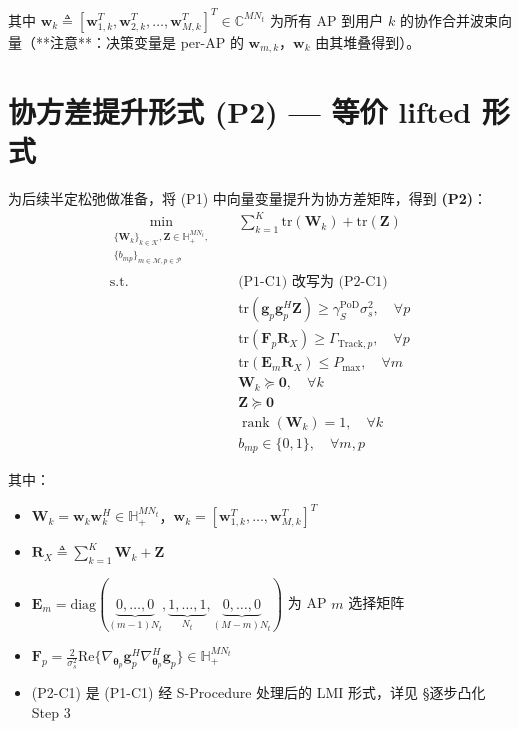 \documentclass[12pt,a4paper]{article}
\newcommand{\vect}[1]{\mathbf{#1}}
\newcommand{\mat}[1]{\mathbf{#1}}
\newcommand{\tr}{\text{tr}}
\newcommand{\Real}{\text{Re}}
\DeclareMathOperator{\rank}{rank}
\begin{document}
其中 $\vect{w}_k \triangleq [\vect{w}_{1,k}^T, \vect{w}_{2,k}^T, \ldots, \vect{w}_{M,k}^T]^T \in \mathbb{C}^{MN_t}$ 为所有 AP 到用户 $k$ 的协作合并波束向量（**注意**：决策变量是 per-AP 的 $\vect{w}_{m,k}$，$\vect{w}_k$ 由其堆叠得到）。

\section{协方差提升形式 (P2) — 等价 lifted 形式}

为后续半定松弛做准备，将 (P1) 中向量变量提升为协方差矩阵，得到 \textbf{(P2)}：
\begin{align}
\min_{\substack{\{\mat{W}_k\}_{k\in\mathcal{K}}, \mat{Z} \in \mathbb{H}_+^{MN_t}, \\ \{b_{mp}\}_{m\in\mathcal{M},p\in\mathcal{P}}}} \quad
& \sum_{k=1}^K \tr(\mat{W}_k) + \tr(\mat{Z}) \tag{P2} \\
\text{s.t.} \quad
& \text{(P1-C1) 改写为 (P2-C1)} \tag{P2-C1} \\
& \tr(\vect{g}_p \vect{g}_p^H \mat{Z}) \geq \gamma_S^{\text{PoD}} \sigma_s^2, \quad \forall p \tag{P2-C2} \\
& \tr(\mat{F}_p \mat{R}_X) \geq \Gamma_{\text{Track},p}, \quad \forall p \tag{P2-C3} \\
& \tr(\mat{E}_m \mat{R}_X) \leq P_{\max}, \quad \forall m \tag{P2-C4} \\
& \mat{W}_k \succeq \mat{0}, \quad \forall k \tag{P2-C5} \\
& \mat{Z} \succeq \mat{0} \tag{P2-C6} \\
& \rank(\mat{W}_k) = 1, \quad \forall k \tag{P2-C7} \\
& b_{mp} \in \{0,1\}, \quad \forall m, p \tag{P2-C8}
\end{align}

其中：
\begin{itemize}
    \item $\mat{W}_k = \vect{w}_k \vect{w}_k^H \in \mathbb{H}_+^{MN_t}$，$\vect{w}_k = [\vect{w}_{1,k}^T, \ldots, \vect{w}_{M,k}^T]^T$
    \item $\mat{R}_X \triangleq \sum_{k=1}^K \mat{W}_k + \mat{Z}$
    \item $\mat{E}_m = \text{diag}(\underbrace{0,\ldots,0}_{(m-1)N_t}, \underbrace{1,\ldots,1}_{N_t}, \underbrace{0,\ldots,0}_{(M-m)N_t})$ 为 AP $m$ 选择矩阵
    \item $\mat{F}_p = \frac{2}{\sigma_s^2}\Real\{\nabla_{\boldsymbol{\theta}_p} \vect{g}_p^H \nabla_{\boldsymbol{\theta}_p}^H \vect{g}_p\} \in \mathbb{H}_+^{MN_t}$
    \item (P2-C1) 是 (P1-C1) 经 S-Procedure 处理后的 LMI 形式，详见 §逐步凸化 Step 3
\end{itemize}
\end{document}
